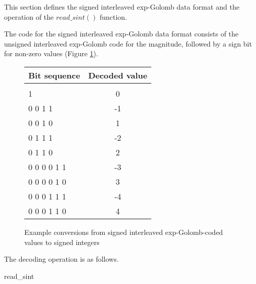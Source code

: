 This section defines the signed interleaved exp-Golomb data format and the operation
of the $read\_sint()$ function.

The code for the signed interleaved exp-Golomb data format consists of the
unsigned interleaved exp-Golomb code for the magnitude, followed by a sign bit
for non-zero values (Figure \ref{segolcodings}).

\begin{figure}[h]
\centering
\begin{tabular}{l|c}
Bit sequence & Decoded value \\
\hline\\
1                 &  0\\
0 0 1 1           &  -1\\
0 0 1 0           &  1\\
0 1 1 1            &  -2\\
0 1 1 0            &  2\\
0 0 0 0 1 1         &  -3\\
0 0 0 0 1 0         &  3\\
0 0 0 1 1 1         &  -4\\
0 0 0 1 1 0         &  4\\
\end{tabular}

\caption{Example conversions from signed interleaved exp-Golomb-coded values 
to signed integers \label{segolcodings}}
\end{figure}

The decoding operation is as follows.

\begin{pseudo}{read\_sint}{}
\bsEND
{}

\end{pseudo}
